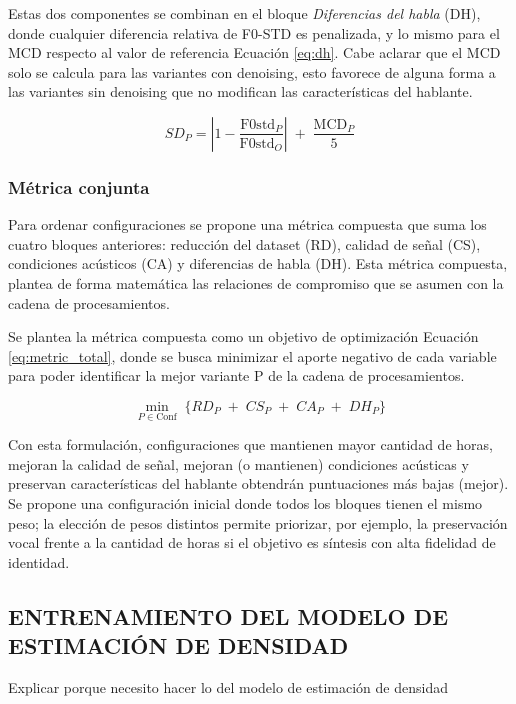 Estas dos componentes se combinan en el bloque \emph{Diferencias del habla} (DH), donde cualquier diferencia relativa de F0-STD es penalizada, y lo mismo para el MCD respecto al valor de referencia Ecuación \ref{eq:dh}. Cabe aclarar que el MCD solo se calcula para las variantes con denoising, esto favorece de alguna forma a las variantes sin denoising que no modifican las características del hablante.

\begin{equation}
\label{eq:dh}
SD_P = 
\left|1 - \frac{\mathrm{F0std}_P}{\mathrm{F0std}_O}\right|
\;+\; \frac{\mathrm{MCD}_P}{5}
\end{equation}

\subsubsection{Métrica conjunta}
Para ordenar configuraciones se propone una métrica compuesta que suma los cuatro bloques anteriores: reducción del dataset (RD), calidad de señal (CS), condiciones acústicos (CA) y diferencias de habla (DH). Esta métrica compuesta, plantea de forma matemática las relaciones de compromiso que se asumen con la cadena de procesamientos. 

Se plantea la métrica compuesta como un objetivo de optimización Ecuación \ref{eq:metric_total}, donde se busca minimizar el aporte negativo de cada variable para poder identificar la mejor variante P de la cadena de procesamientos.

\begin{equation}
\label{eq:metric_total}
\min_{P \in \mathrm{Conf}}\;
\Big\{
RD_{P}
\;+\;
CS_{P}
\;+\;
CA_{P}
\;+\;
DH_{P}
\Big\}
\end{equation}

Con esta formulación, configuraciones que mantienen mayor cantidad de horas, mejoran la calidad de señal, mejoran (o mantienen) condiciones acústicas y preservan características del hablante obtendrán puntuaciones más bajas (mejor). Se propone una configuración inicial donde todos los bloques tienen el mismo peso; la elección de pesos distintos permite priorizar, por ejemplo, la preservación vocal frente a la cantidad de horas si el objetivo es síntesis con alta fidelidad de identidad.

\subsection{ENTRENAMIENTO DEL MODELO DE ESTIMACIÓN DE DENSIDAD}
Explicar porque necesito hacer lo del modelo de estimación de densidad

